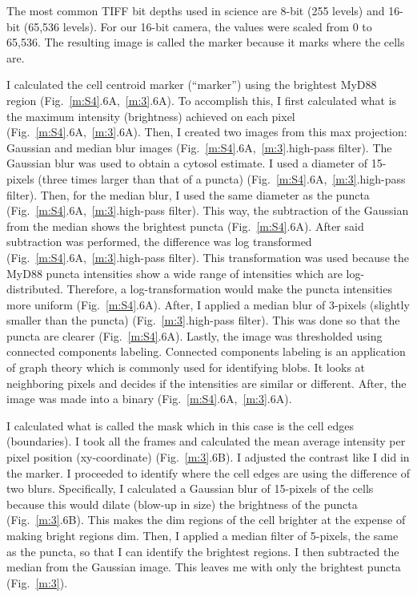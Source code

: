 The most common TIFF bit depths used in science are 8-bit (255 levels) and 16-bit (65,536 levels). For our 16-bit camera, the values were scaled from 0 to 65,536. The resulting image is called the marker because it marks where the cells are.

I calculated the cell centroid marker (“marker”) using the brightest MyD88 region (Fig.~\ref{m:S4}.6A,~\ref{m:3}.6A). To accomplish this, I first calculated what is the maximum intensity (brightness) achieved on each pixel (Fig.~\ref{m:S4}.6A,~\ref{m:3}.6A). Then, I created two images from this max projection: Gaussian and median blur images (Fig.~\ref{m:S4}.6A,~\ref{m:3}.high-pass filter). The Gaussian blur was used to obtain a cytosol estimate. I used a diameter of 15-pixels (three times larger than that of a puncta) (Fig.~\ref{m:S4}.6A,~\ref{m:3}.high-pass filter). Then, for the median blur, I used the same diameter as the puncta (Fig.~\ref{m:S4}.6A,~\ref{m:3}.high-pass filter). This way, the subtraction of the Gaussian from the median shows the brightest puncta (Fig.~\ref{m:S4}.6A). After said subtraction was performed, the difference was log transformed (Fig.~\ref{m:S4}.6A,~\ref{m:3}.high-pass filter). This transformation was used because the MyD88 puncta intensities show a wide range of intensities which are log-distributed. Therefore, a log-transformation would make the puncta intensities more uniform (Fig.~\ref{m:S4}.6A). After, I applied a median blur of 3-pixels (slightly smaller than the puncta) (Fig.~\ref{m:3}.high-pass filter). This was done so that the puncta are clearer (Fig.~\ref{m:S4}.6A). Lastly, the image was thresholded using connected components labeling. Connected components labeling is an application of graph theory which is commonly used for identifying blobs. It looks at neighboring pixels and decides if the intensities are similar or different. After, the image was made into a binary (Fig.~\ref{m:S4}.6A,~\ref{m:3}.6A).

I calculated what is called the mask which in this case is the cell edges (boundaries). I took all the frames and calculated the mean average intensity per pixel position (xy-coordinate) (Fig.~\ref{m:3}.6B). I adjusted the contrast like I did in the marker. I proceeded to identify where the cell edges are using the difference of two blurs. Specifically, I calculated a Gaussian blur of 15-pixels of the cells because this would dilate (blow-up in size) the brightness of the puncta (Fig.~\ref{m:3}.6B). This makes the dim regions of the cell brighter at the expense of making bright regions dim. Then, I applied a median filter of 5-pixels, the same as the puncta, so that I can identify the brightest regions. I then subtracted the median from the Gaussian image. This leaves me with only the brightest puncta (Fig.~\ref{m:3}).


